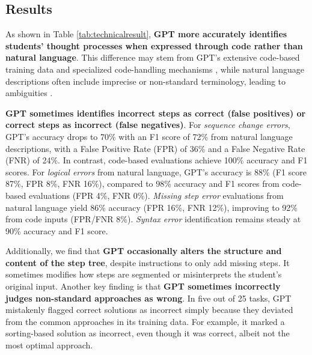 \subsection{Results}
As shown in Table \ref{tab:technicalresult}, \textbf{GPT more accurately identifies students' thought processes when expressed through code rather than natural language}. This difference may stem from GPT's extensive code-based training data \cite{liu2024your} and specialized code-handling mechanisms \cite{achiam2023gpt}, while natural language descriptions often include imprecise or non-standard terminology, leading to ambiguities \cite{liu2023wants}.

\textbf{GPT sometimes identifies incorrect steps as correct (false positives) or correct steps as incorrect (false negatives)}. For \emph{sequence change errors}, GPT’s accuracy drops to 70\% with an F1 score of 72\% from natural language descriptions, with a False Positive Rate (FPR) of 36\% and a False Negative Rate (FNR) of 24\%. In contrast, code-based evaluations achieve 100\% accuracy and F1 scores. For \emph{logical errors} from natural language, GPT’s accuracy is 88\% (F1 score 87\%, FPR 8\%, FNR 16\%), compared to 98\% accuracy and F1 scores from code-based evaluations (FPR 4\%, FNR 0\%). \emph{Missing step error} evaluations from natural language yield 86\% accuracy (FPR 16\%, FNR 12\%), improving to 92\% from code inputs (FPR/FNR 8\%). \emph{Syntax error} identification remains steady at 90\% accuracy and F1 score.

Additionally, we find that \textbf{GPT occasionally alters the structure and content of the step tree}, despite instructions to only add missing steps. It sometimes modifies how steps are segmented or misinterprets the student's original input. Another key finding is that \textbf{GPT sometimes incorrectly judges non-standard approaches as wrong}. In five out of 25 tasks, GPT mistakenly flagged correct solutions as incorrect simply because they deviated from the common approaches in its training data. For example, it marked a sorting-based solution as incorrect, even though it was correct, albeit not the most optimal approach.





